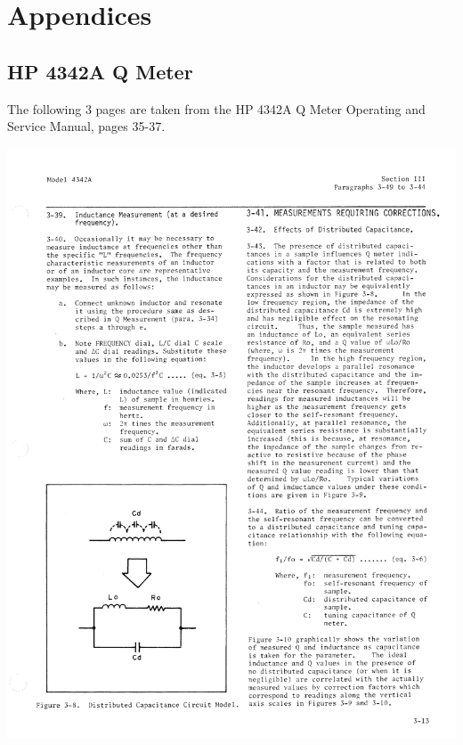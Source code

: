 \documentclass[titlepage, letterpaper, 11pt]{article}
\begin{document}
\section{Appendices}

\subsection{HP 4342A Q Meter}
\label{qMeter}

The following 3 pages are taken from the HP 4342A Q Meter Operating
and Service Manual, pages 35-37.

\clearpage
\includegraphics[width=1\textwidth]{qMeter/page35}
\end{document}

